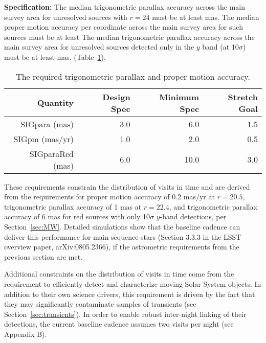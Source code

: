 \textbf{Specification:} The median trigonometric parallax accuracy across the main
survey area for unresolved sources with $r=24$ must be at least
 mas.
The median proper motion accuracy per coordinate across the main
survey area for such sources must be at least
The median trigonometric parallax accuracy across the main survey area for unresolved
sources detected only in the $y$ band (at 10$\sigma$) must be at least
 mas.
(Table~\ref{TablePARAPM}).

\begin{table}[h]
\begin{tabular}{|r|r|r|r|}
\hline
Quantity                & Design Spec & Minimum Spec & Stretch Goal       \\
\hline
  SIGpara (mas)             &    3.0     &     6.0          &    1.5         \\
  SIGpm   (mas/yr)        &    1.0     &     2.0          &    0.5         \\
  SIGparaRed (mas)        &   6.0     &    10.0          &    3.0         \\
\hline
\end{tabular}
\caption{The required trigonometric parallax and proper motion accuracy.}
\label{TablePARAPM}
\end{table}

These requirements constrain the distribution of visits in time and are derived
from the requirements for proper motion accuracy of 0.2 mas/yr at $r=20.5$,
trigonometric parallax accuracy of 1 mas at $r=22.4$, and trigonometric parallax
accuracy of 6 mas for red sources with only 10$\sigma$ $y$-band detections, per
Section~\ref{sec:MW}. Detailed simulations show that the baseline cadence can deliver
this performance for main sequence stars (Section 3.3.3 in the LSST overview paper,
arXiv:0805.2366), if the astrometric requirements from the previous section are met.


Additional constraints on the distribution of visits in time come from
the requirement to efficiently detect and characterize moving Solar System
objects. In addition to their own science drivers, this requirement is driven
by the fact that they may significantly contaminate samples of transients
(see Section~\ref{sec:transients}).  In order to enable robust inter-night
linking of their detections, the current baseline cadence assumes two
visits per night  (see Appendix B).


